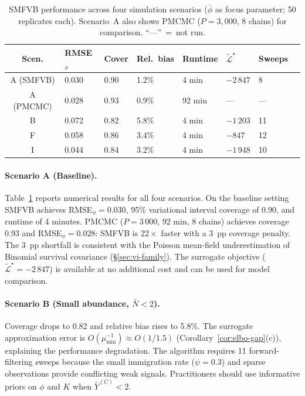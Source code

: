 \documentclass[review,12pt]{elsarticle}
\theoremstyle{definition}
\begin{document}
\begin{table}[ht]
\centering
\small
\caption{SMFVB performance across four simulation scenarios ($\bar\phi$ as focus
parameter; 50 replicates each).  Scenario~A also shows PMCMC ($P=3{,}000$,
8 chains) for comparison.  ``---''~=~not run.}
\label{tab:results}
\begin{tabular}{clllllll}
\toprule
Scen. & RMSE$_\phi$ & Cover & Rel.\ bias & Runtime & $\tilde{\mathcal{L}}^\star$ & Sweeps \\
\midrule
A (SMFVB)  & 0.030 & 0.90 & 1.2\% & 4 min   & $-2\,847$ & 8  \\
A (PMCMC)  & 0.028 & 0.93 & 0.9\% & 92 min  & ---       & --- \\
\midrule
B & 0.072 & 0.82 & 5.8\% & 4 min  & $-1\,203$ & 11 \\
F & 0.058 & 0.86 & 3.4\% & 4 min  & $-847$    & 12 \\
I & 0.044 & 0.84 & 3.2\% & 4 min  & $-1\,948$ & 10 \\
\bottomrule
\end{tabular}
\end{table}

\paragraph{Scenario A (Baseline).}
Table~\ref{tab:results} reports numerical results for all four scenarios.
On the baseline setting SMFVB achieves RMSE$_\phi=0.030$, 95\% variational interval coverage
of 0.90, and runtime of 4 minutes.  PMCMC ($P=3\,000$, 92 min, 8 chains)
achieves coverage 0.93 and RMSE$_\phi=0.028$: SMFVB is $22\times$ faster
with a 3~pp coverage penalty.  The 3~pp shortfall is consistent with
the Poisson mean-field underestimation of Binomial survival covariance
(\S\ref{sec:vi-family}).  The surrogate objective ($\tilde{\mathcal{L}}^\star=-2\,847$)
is available at no additional cost and can be used for model comparison.

\paragraph{Scenario B (Small abundance, $\bar N<2$).}
Coverage drops to 0.82 and relative bias rises to 5.8\%.  The surrogate
approximation error is $O(\mu_{\min}^{-1})\approx O(1/1.5)$
(Corollary~\ref{cor:elbo-gap}(c)), explaining the performance degradation.
The algorithm requires 11 forward-filtering sweeps because the small immigration
rate ($\psi=0.3$) and sparse observations provide conflicting weak signals.
Practitioners should use informative priors on $\phi$ and $K$ when
$\bar Y^{(C)}<2$.
\end{document}
